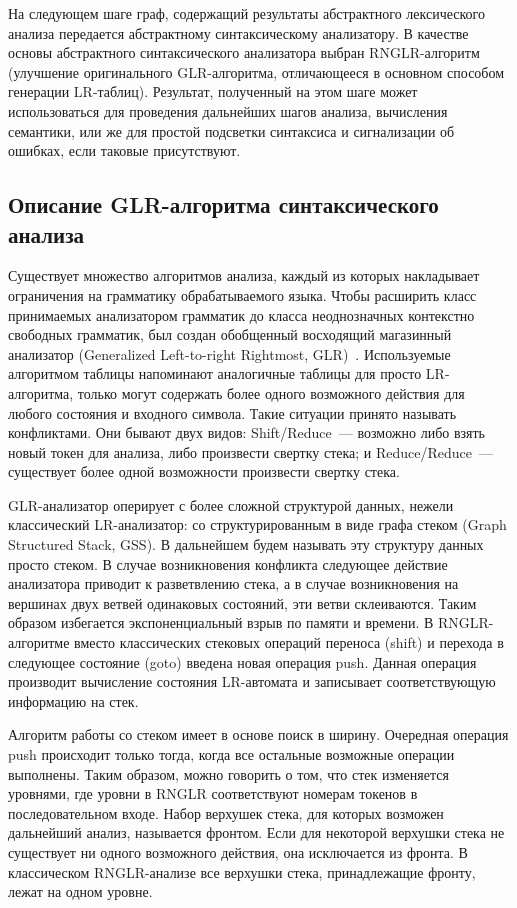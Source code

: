 \documentclass{matmex-diploma}
\begin{document}
На следующем шаге граф, содержащий результаты абстрактного лексического анализа 
передается абстрактному синтаксическому анализатору. В качестве основы абстрактного 
синтаксического анализатора выбран RNGLR-алгоритм (улучшение оригинального GLR-алгоритма, 
отличающееся в основном способом генерации LR-таблиц). Результат, полученный на 
этом шаге может использоваться для проведения дальнейших шагов анализа, вычисления 
семантики, или же для простой подсветки синтаксиса и сигнализации об ошибках, 
если таковые присутствуют.

\subsection{Описание GLR-алгоритма синтаксического анализа}
Существует множество алгоритмов анализа, каждый из которых накладывает ограничения 
на грамматику обрабатываемого языка. Чтобы расширить класс принимаемых анализатором
грамматик до класса неоднозначных контекстно свободных грамматик, был создан 
обобщенный восходящий магазинный анализатор (Generalized Left-to-right Rightmost,
GLR)~\cite{Tomita:1985:EPN:537456}. Используемые алгоритмом таблицы напоминают аналогичные таблицы для просто 
LR-алгоритма, только могут содержать более одного возможного действия для любого 
состояния и входного символа. Такие ситуации принято называть конфликтами. Они 
бывают двух видов: Shift/Reduce~— возможно либо взять новый токен для анализа,
либо произвести свертку стека; и Reduce/Reduce~— существует более одной возможности 
произвести свертку стека. 

GLR-анализатор оперирует с более сложной структурой данных, нежели классический 
LR-анализатор: со структурированным в виде графа стеком (Graph Structured Stack, GSS). 
В дальнейшем будем называть эту структуру данных просто стеком.  В случае возникновения 
конфликта следующее действие анализатора приводит к разветвлению стека, а в случае 
возникновения на вершинах двух ветвей одинаковых состояний, эти ветви склеиваются.
Таким образом избегается экспоненциальный взрыв по памяти и времени. В RNGLR-алгоритме 
вместо классических стековых операций переноса (shift) и перехода в следующее состояние 
(goto) введена новая операция push. Данная операция производит вычисление состояния 
LR-автомата и записывает соответствующую информацию на стек. 

Алгоритм работы со стеком имеет в основе поиск в ширину. Очередная операция push 
происходит только тогда, когда все остальные возможные операции выполнены. Таким 
образом, можно говорить о том, что стек изменяется уровнями, где уровни в RNGLR 
соответствуют номерам токенов в последовательном входе. Набор верхушек стека, для 
которых возможен дальнейший анализ, называется фронтом. Если для некоторой верхушки 
стека не существует ни одного возможного действия, она исключается из фронта. В 
классическом RNGLR-анализе все верхушки стека, принадлежащие фронту, лежат на одном 
уровне.
\end{document}
